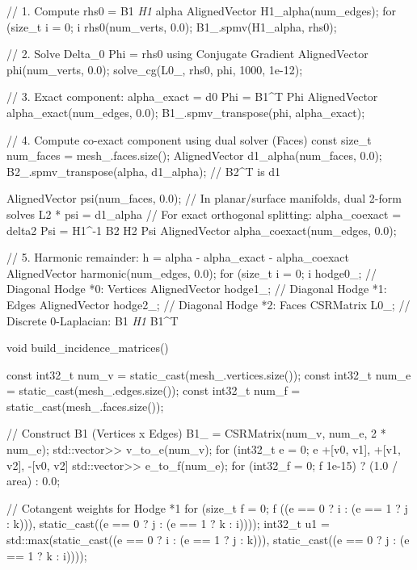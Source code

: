 \documentclass[11pt,twoside,openright]{amsbook}
\begin{document}
{{{{{        // 1. Compute rhs0 = B1 \textit{ H1 } alpha
        AlignedVector H1_alpha(num_edges);
        for (size_t i = 0; i  rhs0(num_verts, 0.0);
        B1_.spmv(H1_alpha, rhs0);

        // 2. Solve Delta_0 Phi = rhs0 using Conjugate Gradient
        AlignedVector phi(num_verts, 0.0);
        solve_cg(L0_, rhs0, phi, 1000, 1e-12);

        // 3. Exact component: alpha_exact = d0 Phi = B1^T Phi
        AlignedVector alpha_exact(num_edges, 0.0);
        B1_.spmv_transpose(phi, alpha_exact);

        // 4. Compute co-exact component using dual solver (Faces)
        const size_t num_faces = mesh_.faces.size();
        AlignedVector d1_alpha(num_faces, 0.0);
        B2_.spmv_transpose(alpha, d1_alpha); // B2^T is d1

        AlignedVector psi(num_faces, 0.0);
        // In planar/surface manifolds, dual 2-form solves L2 * psi = d1_alpha
        // For exact orthogonal splitting: alpha_coexact = delta2 Psi = H1^{-1} B2 H2 Psi
        AlignedVector alpha_coexact(num_edges, 0.0);

        // 5. Harmonic remainder: h = alpha - alpha_exact - alpha_coexact
        AlignedVector harmonic(num_edges, 0.0);
        for (size_t i = 0; i  hodge0_; // Diagonal Hodge *0: Vertices
    AlignedVector hodge1_; // Diagonal Hodge *1: Edges
    AlignedVector hodge2_; // Diagonal Hodge *2: Faces
    CSRMatrix L0_; // Discrete 0-Laplacian: B1 \textit{ H1 } B1^T

    void build_incidence_matrices() {
        const int32_t num_v = static_cast(mesh_.vertices.size());
        const int32_t num_e = static_cast(mesh_.edges.size());
        const int32_t num_f = static_cast(mesh_.faces.size());

        // Construct B1 (Vertices x Edges)
        B1_ = CSRMatrix(num_v, num_e, 2 * num_e);
        std::vector>> v_to_e(num_v);
        for (int32_t e = 0; e  +[v0, v1], +[v1, v2], -[v0, v2]
        std::vector>> e_to_f(num_e);
        for (int32_f = 0; f  1e-15) ? (1.0 / area) : 0.0;
        }

        // Cotangent weights for Hodge *1
        for (size_t f = 0; f ((e == 0 ? i : (e == 1 ? j : k))),
                                      static_cast((e == 0 ? j : (e == 1 ? k : i))));
                int32_t u1 = std::max(static_cast((e == 0 ? i : (e == 1 ? j : k))),
                                      static_cast((e == 0 ? j : (e == 1 ? k : i))));

}}}}}
\end{document}
